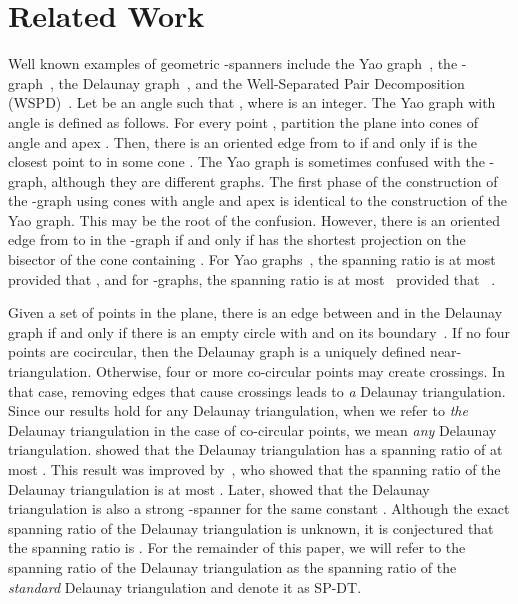 \documentclass[pdftex,leqno,fleqn,12pt]{article}
\newcommand{\sdsr}{{\rm{SP-DT}}}
\begin{document}
\section{Related Work}\label{section-disk-del-related}

Well known examples of geometric -spanners include the Yao
graph~\cite{yao82}, the -graph~\cite{ruppert91}, the Delaunay
graph~\cite{keil92}, and the Well-Separated Pair Decomposition
(WSPD)~\cite{callahan95}. Let  be an angle such that
, where  is an integer. The Yao graph with angle 
is defined as follows. For every point , partition the plane into 
cones  of angle  and apex .  Then, there
is an oriented edge from  to  if and only if  is the closest point
to  in some cone . The Yao graph is sometimes confused with the
-graph, although they are different graphs. The first phase of the
construction of the -graph using  cones with angle  and
apex  is identical to the construction of the Yao graph. This may be the
root of the confusion. However, there is an oriented edge from  to  in
the -graph if and only if  has the shortest projection on the
bisector of the cone containing . For Yao graphs~\cite{yao82}, the
spanning ratio is at most  provided that
, and for -graphs, the spanning ratio is at
most~ provided that
~\cite{ruppert91}.

Given a set of points in the plane, there is an edge between  and  in the
Delaunay graph if and only if there is an empty circle with  and  on its
boundary~\cite{keil92}.  If no four points are cocircular, then the Delaunay
graph is a uniquely defined near-triangulation. Otherwise, four or more
co-circular points may create crossings. In that case, removing edges that
cause crossings leads to \emph{a} Delaunay triangulation. Since our results
hold for any Delaunay triangulation, when we refer to \emph{the} Delaunay
triangulation in the case of co-circular points, we mean \emph{any} Delaunay
triangulation. \citet{dobkin90} showed that the Delaunay triangulation has a
spanning ratio of at most . This result
was improved by~\citet{keil92}, who showed that the spanning ratio of the
Delaunay triangulation is at most .  Later,
\citet{bose04} showed that the Delaunay triangulation is also a strong
-spanner for the same constant .  Although the exact
spanning ratio of the Delaunay triangulation is unknown, it is conjectured that
the spanning ratio is . For the remainder of this paper, we will refer
to the spanning ratio of the Delaunay triangulation as the spanning ratio of
the {\em standard} Delaunay triangulation and denote it as \sdsr.
\end{document}
